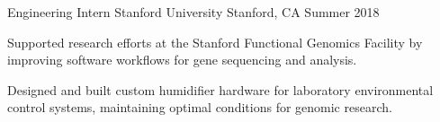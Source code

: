 \documentclass[12pt, letterpaper]{russell}
\begin{document}
\begin{cventries}
\vspace{0.1cm}

  \cventry
    {Engineering Intern} %
    {Stanford University} %
    {Stanford, CA} %
    {Summer 2018} %
    {
      \begin{cvitems}
        \item {Supported research efforts at the Stanford Functional Genomics Facility by improving software workflows for gene sequencing and analysis.}
        \item {Designed and built custom humidifier hardware for laboratory environmental control systems, maintaining optimal conditions for genomic research.}
      \end{cvitems}
    }

\end{cventries}
\vspace{-0.25cm}
\end{document}
